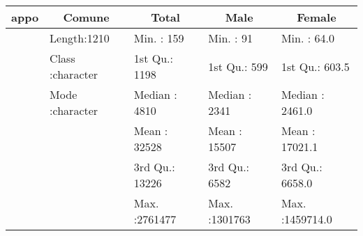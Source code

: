 \begin{table}[!tbp]
\begin{center}
\begin{tabular}{lllll}
\hline\hline
\multicolumn{1}{l}{appo}&\multicolumn{1}{c}{   Comune}&\multicolumn{1}{c}{    Total}&\multicolumn{1}{c}{     Male}&\multicolumn{1}{c}{    Female}\tabularnewline
\hline
&Length:1210       &Min.   :    159  &Min.   :     91  &Min.   :     64.0  \tabularnewline
&Class :character  &1st Qu.:   1198  &1st Qu.:    599  &1st Qu.:    603.5  \tabularnewline
&Mode  :character  &Median :   4810  &Median :   2341  &Median :   2461.0  \tabularnewline
&&Mean   :  32528  &Mean   :  15507  &Mean   :  17021.1  \tabularnewline
&&3rd Qu.:  13226  &3rd Qu.:   6582  &3rd Qu.:   6658.0  \tabularnewline
&&Max.   :2761477  &Max.   :1301763  &Max.   :1459714.0  \tabularnewline
\hline
\end{tabular}\end{center}

\end{table}
